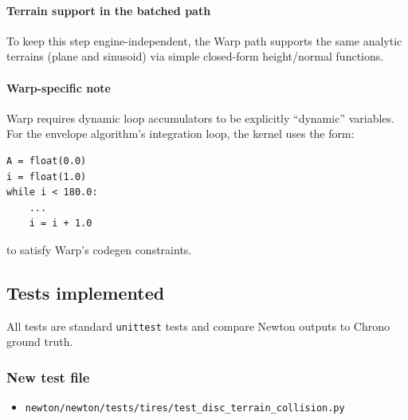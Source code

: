 \paragraph{Terrain support in the batched path}
To keep this step engine-independent, the Warp path supports the same analytic terrains
(plane and sinusoid) via simple closed-form height/normal functions.

\paragraph{Warp-specific note}
Warp requires dynamic loop accumulators to be explicitly ``dynamic'' variables.
For the envelope algorithm's integration loop, the kernel uses the form:
\begin{verbatim}
A = float(0.0)
i = float(1.0)
while i < 180.0:
    ...
    i = i + 1.0
\end{verbatim}
to satisfy Warp's codegen constraints.

\subsection{Tests implemented}
All tests are standard \texttt{unittest} tests and compare Newton outputs to Chrono ground truth.

\subsubsection{New test file}
\begin{itemize}
  \item \texttt{newton/newton/tests/tires/test\_disc\_terrain\_collision.py}
\end{itemize}

